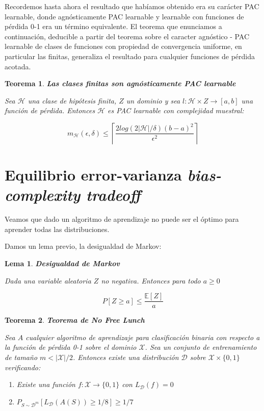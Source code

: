 \documentclass[11pt]{article}
\newtheorem{theorem}{Teorema}
\newtheorem{lemma}{Lema}
\begin{document}
Recordemos hasta ahora el resultado que habíamos obtenido era su carácter PAC learnable, donde agnósticamente PAC learnable y learnable con funciones de pérdida 0-1 era un término equivalente. El teorema que enunciamos a continuación, deducible a partir del teorema sobre el caracter agnóstico - PAC learnable de clases de funciones con propiedad de convergencia uniforme, en particular las finitas, generaliza el resultado para cualquier funciones de pérdida acotada.

\begin{theorem}
\textbf{Las clases finitas son agnósticamente PAC learnable}

Sea $\mathcal{H}$ una clase de hipótesis finita, $Z$ un dominio y sea $l : \mathcal{H} \times Z \rightarrow [a,b]$ una función de pérdida. Entonces $\mathcal{H}$ es PAC learnable con complejidad muestral:

\[m_{\mathcal{H}}( \epsilon, \delta ) \le \left\lceil \frac{2 log(2|\mathcal{H}|/\delta)(b-a)^2}{\epsilon^2} \right\rceil\]
\end{theorem}

\section{Equilibrio error-varianza \emph{bias-complexity tradeoff}}
\label{sec-5}
Veamos que dado un algoritmo de aprendizaje no puede ser el óptimo para aprender todas las distribuciones.

Damos un lema previo, la desigualdad de Markov:

\begin{lemma}
\textbf{Desigualdad de Markov}

Dada una variable aleatoria $Z$ no negativa. Entonces para todo $a\ge 0$

\[P[Z \ge a] \le \frac{\mathbb{E}[Z]}{a}\]
\end{lemma}

\begin{theorem}
\textbf{Teorema de No Free Lunch}

Sea $A$ cualquier algoritmo de aprendizaje para clasificación binaria con respecto a la función de pérdida 0-1 sobre el dominio $\mathcal{X}$. Sea un conjunto de entrenamiento de tamaño $m < |\mathcal{X}|/2$. Entonces existe una distribución $\mathcal{D}$ sobre $\mathcal{X} \times \{0,1\}$ verificando:

\begin{enumerate}
\item Existe una función $f: \mathcal{X} \rightarrow \{0,1\}$ con $L_{\mathcal{D}}(f)=0$
\item $P_{S\sim \mathcal{D}^m} [L_{\mathcal{D}} (A(S)) \ge 1/8] \ge 1/7$
\end{enumerate}
\end{theorem}
\end{document}
